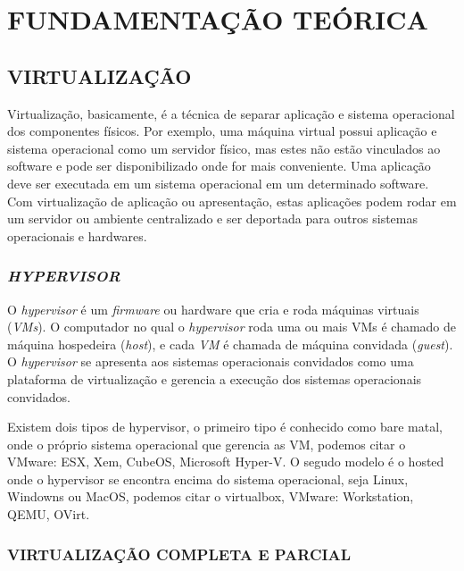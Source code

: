 
\chapter{FUNDAMENTAÇÃO TEÓRICA}
\label{chap:fundamentacaoTeorica}

\section{VIRTUALIZAÇÃO}
\label{sec:virtualizacao}

Virtualização, basicamente, é a técnica de separar aplicação e sistema operacional dos componentes físicos. Por exemplo, uma máquina virtual possui aplicação e sistema operacional como um servidor físico, mas estes não estão vinculados ao software e pode ser disponibilizado onde for mais conveniente. Uma aplicação deve ser executada em um sistema operacional em um determinado software. Com virtualização de aplicação ou apresentação, estas aplicações podem rodar em um servidor ou ambiente centralizado e ser deportada para outros sistemas operacionais e hardwares.

\subsection{\textit{HYPERVISOR}}
\label{sec:hypervisor}

O \textit{hypervisor} é um \textit{firmware} ou hardware que cria e roda máquinas virtuais (\textit{VMs}). O computador no qual o \textit{hypervisor} roda uma ou mais VMs é chamado de máquina hospedeira (\textit{host}), e cada \textit{VM} é chamada de máquina convidada (\textit{guest}). O \textit{hypervisor} se apresenta aos sistemas operacionais convidados como uma plataforma de virtualização e gerencia a execução dos sistemas operacionais convidados. 

Existem dois tipos de hypervisor, o primeiro tipo é conhecido como bare matal, onde o próprio sistema operacional que gerencia as VM, podemos citar o VMware: ESX, Xem, CubeOS, Microsoft Hyper-V. O segudo modelo é o hosted onde o hypervisor se encontra encima do sistema operacional, seja Linux, Windowns ou MacOS, podemos citar o virtualbox, VMware: Workstation, QEMU, OVirt.   

\subsection{VIRTUALIZAÇÃO COMPLETA E PARCIAL}
\label{sec:virtualizacao-completa-parcial}

